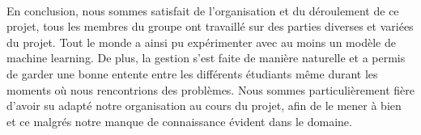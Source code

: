 \paragraph{} En conclusion, nous sommes satisfait de l'organisation et du déroulement de ce projet, tous les membres du groupe ont travaillé sur des parties diverses et variées du projet. Tout le monde a ainsi pu expérimenter avec au moins un modèle de machine learning. De plus, la gestion s'est faite de manière naturelle et a permis de garder une bonne entente entre les différents étudiants même durant les moments où nous rencontrions des problèmes. Nous sommes particulièrement fière d'avoir su adapté notre organisation au cours du projet, afin de le mener à bien et ce malgrés notre manque de connaissance évident dans le domaine.